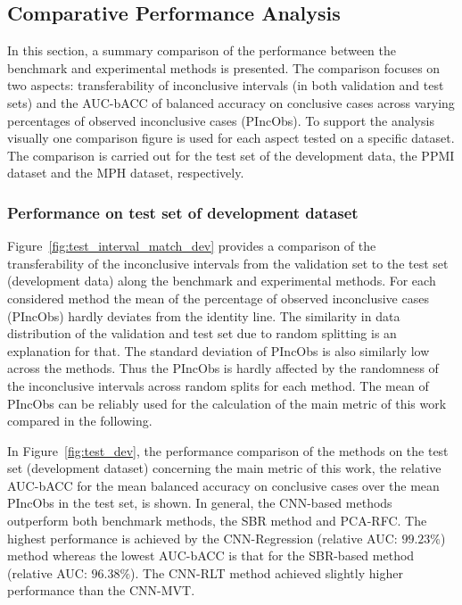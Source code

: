 \subsection{Comparative Performance Analysis}
\label{subsec:compar_anal}

In this section, a summary comparison of the performance between the benchmark and experimental methods is presented.
The comparison focuses on two aspects: transferability of inconclusive intervals (in both validation and test sets) 
and the AUC-bACC of balanced accuracy on conclusive cases across varying percentages of observed inconclusive cases (PIncObs).
To support the analysis visually one comparison figure is used for each aspect tested on a specific dataset.
The comparison is carried out for the test set of the development data, 
the PPMI dataset and the MPH dataset, respectively.

\subsubsection{Performance on test set of development dataset}

Figure~\ref{fig:test_interval_match_dev} provides a comparison of the transferability of the inconclusive intervals 
from the validation set to the test set (development data) along the benchmark and experimental methods.
For each considered method the mean of the percentage of observed inconclusive cases (PIncObs) 
hardly deviates from the identity line.
The similarity in data distribution of the validation and test set due to random splitting is an explanation for that.
The standard deviation of PIncObs is also similarly low across the methods.
Thus the PIncObs is hardly affected by the randomness of the inconclusive intervals across random splits for each method.
The mean of PIncObs can be reliably used for the calculation of the main metric of this work compared in the following.

In Figure~\ref{fig:test_dev}, the performance comparison of the methods on the test set (development dataset) 
concerning the main metric of this work, 
the relative AUC-bACC for the mean balanced accuracy on conclusive cases
over the mean PIncObs in the test set, is shown.
In general, the CNN-based methods outperform both benchmark methods, the SBR method and PCA-RFC.
The highest performance is achieved by the CNN-Regression (relative AUC: $99.23\%$) method 
whereas the lowest AUC-bACC is that for the SBR-based method (relative AUC: $96.38\%$).
The CNN-RLT method achieved slightly higher performance than the CNN-MVT.


